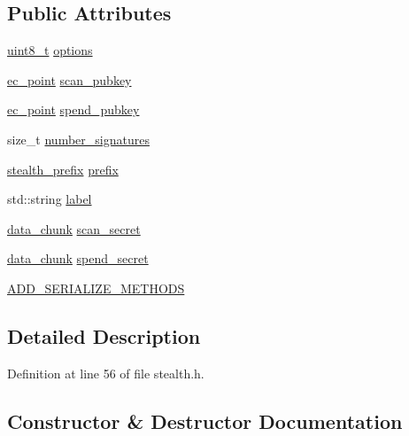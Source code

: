\subsection*{Public Attributes}
\begin{DoxyCompactItemize}
\item 
\hyperlink{stdint_8h_aba7bc1797add20fe3efdf37ced1182c5}{uint8\+\_\+t} \hyperlink{class_c_stealth_address_a5dc6e5ddb43a2ecdede5278abb9495ed}{options}
\item 
\hyperlink{stealth_8h_ad3f41152eaa5a117a5e3f553c8aacec0}{ec\+\_\+point} \hyperlink{class_c_stealth_address_ae695d1d4c649d3f78b253de7d273b1d9}{scan\+\_\+pubkey}
\item 
\hyperlink{stealth_8h_ad3f41152eaa5a117a5e3f553c8aacec0}{ec\+\_\+point} \hyperlink{class_c_stealth_address_ac66ac2e04abb7ee90555c702dfa3049c}{spend\+\_\+pubkey}
\item 
size\+\_\+t \hyperlink{class_c_stealth_address_a5c4d8f08483d31c17e6e711cdbe705ef}{number\+\_\+signatures}
\item 
\hyperlink{structstealth__prefix}{stealth\+\_\+prefix} \hyperlink{class_c_stealth_address_a588786324128a664096e99331db25d68}{prefix}
\item 
std\+::string \hyperlink{class_c_stealth_address_a55084bdf98f10d5d5451ca73cc3f2395}{label}
\item 
\hyperlink{stealth_8h_ad92186dd18ebcc998b0efbbafed7a398}{data\+\_\+chunk} \hyperlink{class_c_stealth_address_a0f2033aa89023f33da354a7652e128a3}{scan\+\_\+secret}
\item 
\hyperlink{stealth_8h_ad92186dd18ebcc998b0efbbafed7a398}{data\+\_\+chunk} \hyperlink{class_c_stealth_address_a20697e3fc4e92648a190755cd44ee2ea}{spend\+\_\+secret}
\item 
\hyperlink{class_c_stealth_address_aca7a00fad5200f051b29be4775fdd079}{A\+D\+D\+\_\+\+S\+E\+R\+I\+A\+L\+I\+Z\+E\+\_\+\+M\+E\+T\+H\+O\+D\+S}
\end{DoxyCompactItemize}


\subsection{Detailed Description}


Definition at line 56 of file stealth.\+h.



\subsection{Constructor \& Destructor Documentation}
\hypertarget{class_c_stealth_address_adbc121fd61e98fd17a395b1dd081561a}{}
